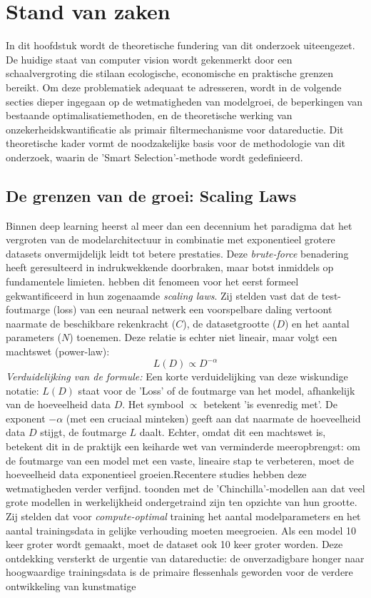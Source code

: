 \chapter{Stand van zaken}\label{ch:stand-van-zaken}In dit hoofdstuk wordt de theoretische fundering van dit onderzoek uiteengezet. De huidige staat van computer vision wordt gekenmerkt door een schaalvergroting die stilaan ecologische, economische en praktische grenzen bereikt. Om deze problematiek adequaat te adresseren, wordt in de volgende secties dieper ingegaan op de wetmatigheden van modelgroei, de beperkingen van bestaande optimalisatiemethoden, en de theoretische werking van onzekerheidskwantificatie als primair filtermechanisme voor datareductie. Dit theoretische kader vormt de noodzakelijke basis voor de methodologie van dit onderzoek, waarin de 'Smart Selection'-methode wordt gedefinieerd.\section{De grenzen van de groei: Scaling Laws}\label{sec:scaling-laws}Binnen deep learning heerst al meer dan een decennium het paradigma dat het vergroten van de modelarchitectuur in combinatie met exponentieel grotere datasets onvermijdelijk leidt tot betere prestaties. Deze \textit{brute-force} benadering heeft geresulteerd in indrukwekkende doorbraken, maar botst inmiddels op fundamentele limieten.\textcite{kaplan2020scaling} hebben dit fenomeen voor het eerst formeel gekwantificeerd in hun zogenaamde \textit{scaling laws}. Zij stelden vast dat de test-foutmarge (loss) van een neuraal netwerk een voorspelbare daling vertoont naarmate de beschikbare rekenkracht ($C$), de datasetgrootte ($D$) en het aantal parameters ($N$) toenemen. Deze relatie is echter niet lineair, maar volgt een machtswet (power-law):$$L(D) \propto D^{-\alpha}$$\textit{Verduidelijking van de formule:} Een korte verduidelijking van deze wiskundige notatie: $L(D)$ staat voor de 'Loss' of de foutmarge van het model, afhankelijk van de hoeveelheid data $D$. Het symbool $\propto$ betekent 'is evenredig met'. De exponent $-\alpha$ (met een cruciaal minteken) geeft aan dat naarmate de hoeveelheid data $D$ stijgt, de foutmarge $L$ daalt. Echter, omdat dit een machtswet is, betekent dit in de praktijk een keiharde wet van verminderde meeropbrengst: om de foutmarge van een model met een vaste, lineaire stap te verbeteren, moet de hoeveelheid data exponentieel groeien.Recentere studies hebben deze wetmatigheden verder verfijnd. \textcite{hoffmann2022training} toonden met de 'Chinchilla'-modellen aan dat veel grote modellen in werkelijkheid ondergetraind zijn ten opzichte van hun grootte. Zij stelden dat voor \textit{compute-optimal} training het aantal modelparameters en het aantal trainingsdata in gelijke verhouding moeten meegroeien. Als een model 10 keer groter wordt gemaakt, moet de dataset ook 10 keer groter worden. Deze ontdekking versterkt de urgentie van datareductie: de onverzadigbare honger naar hoogwaardige trainingsdata is de primaire flessenhals geworden voor de verdere ontwikkeling van kunstmatige 